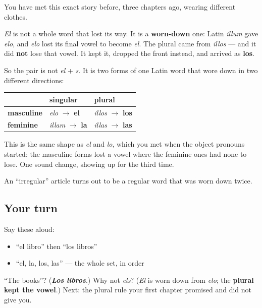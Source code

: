 \begin{cousinweb}
You have met this exact story before, three chapters ago, wearing different clothes.

\emph{El} is not a whole word that lost its way. It is a \textbf{worn-down} one: Latin \emph{illum} gave \emph{elo}, and \emph{elo} lost its final vowel to become \emph{el}. The plural came from \emph{illos} — and it did \textbf{not} lose that vowel. It kept it, dropped the front instead, and arrived as \textbf{los}.

So the pair is not \emph{el} + \emph{s}. It is two forms of one Latin word that wore down in two different directions:

\noindent
\begin{tabularx}{\linewidth}{@{}>{\raggedright\arraybackslash}X>{\raggedright\arraybackslash}X>{\raggedright\arraybackslash}X@{}}
\toprule
\textbf{} & \textbf{singular} & \textbf{plural} \\
\midrule
\textbf{masculine} & \emph{elo} $\to$ \textbf{el} & \emph{illos} $\to$ \textbf{los} \\
\textbf{feminine} & \emph{illam} $\to$ \textbf{la} & \emph{illas} $\to$ \textbf{las} \\
\bottomrule
\end{tabularx}

This is the same shape as \emph{el} and \emph{lo}, which you met when the object pronouns started: the masculine forms lost a vowel where the feminine ones had none to lose. One sound change, showing up for the third time.

An \textquotedblleft{}irregular\textquotedblright{} article turns out to be a regular word that was worn down twice.
\end{cousinweb}

\subsection*{Your turn}
Say these aloud:

\begin{itemize}
\raggedright
  \item \textquotedblleft{}el libro\textquotedblright{} then \textquotedblleft{}los libros\textquotedblright{}
  \item \textquotedblleft{}el, la, los, las\textquotedblright{} — the whole set, in order
\end{itemize}

\begin{tcolorbox}[breakable,colback=teal!4,colframe=teal!35!black,title={Before you move on}]
\textquotedblleft{}The books\textquotedblright{}? (\emph{\textbf{Los libros}}.) Why not \emph{els}? (\emph{El} is worn down from \emph{elo}; the \textbf{plural kept the vowel}.) Next: the plural rule your first chapter promised and did not give you.
\end{tcolorbox}
